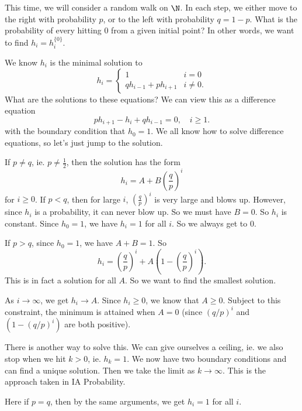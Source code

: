 \documentclass[a4paper]{article}
\begin{document}
\begin{eg}
  This time, we will consider a random walk on $\N$. In each step, we either move to the right with probability $p$, or to the left with probability $q = 1 - p$. What is the probability of every hitting $0$ from a given initial point? In other words, we want to find $h_i = h_i^{\{0\}}$.

  We know $h_i$ is the minimal solution to
  \[
    h_i =
    \begin{cases}
      1 & i = 0\\
      qh_{i - 1} + ph_{i + 1} & i \not= 0.
    \end{cases}
  \]
  What are the solutions to these equations? We can view this as a difference equation
  \[
    ph_{i + 1} - h_i + qh_{i - 1} = 0,\quad i \geq 1.
  \]
  with the boundary condition that $h_0 = 1$. We all know how to solve difference equations, so let's just jump to the solution.

  If $p \not= q$, ie. $p \not= \frac{1}{2}$, then the solution has the form
  \[
    h_i = A + B\left(\frac{q}{p}\right)^i
  \]
  for $i \geq 0$. If $p < q$, then for large $i$, $\left(\frac{q}{p}\right)^i$ is very large and blows up. However, since $h_i$ is a probability, it can never blow up. So we must have $B = 0$. So $h_i$ is constant. Since $h_0 = 1$, we have $h_i = 1$ for all $i$. So we always get to $0$.

  If $p > q$, since $h_0 = 1$, we have $A + B = 1$. So
  \[
    h_i = \left(\frac{q}{p}\right)^i + A\left(1 - \left(\frac{q}{p}\right)^i\right).
  \]
  This is in fact a solution for all $A$. So we want to find the smallest solution.

  As $i \to\infty$, we get $h_i \to A$. Since $h_i \geq 0$, we know that $A \geq 0$. Subject to this constraint, the minimum is attained when $A = 0$ (since $(q/p)^i$ and $(1 - (q/p)^i)$ are both positive).

  There is another way to solve this. We can give ourselves a ceiling, ie. we also stop when we hit $k > 0$, ie. $h_k = 1$. We now have two boundary conditions and can find a unique solution. Then we take the limit as $k \to \infty$. This is the approach taken in IA Probability.

  Here if $p = q$, then by the same arguments, we get $h_i = 1$ for all $i$.
\end{eg}
\end{document}
